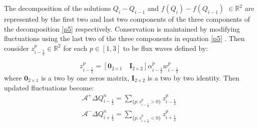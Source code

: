 \documentclass[10pt,a4paper]{article}
\newcommand{\donna}[1]{{\color{red}{#1}}}
\begin{document}
	The decomposition of the solutions $Q_{i} - Q_{i-1} $  and  $f(Q_{i}) - f(Q_{i-1})$ $ \in  \mathbb{R}^{2}$ are represented by the first two and last two components of the three components of the decomposition \eqref{p5} respectively.  Conservation is maintained by modifying fluctuations using the last two of the three components  in equation \eqref{p5} \cite{ba-le-mi-ro:2003}. Then  consider $z_{i-\frac{1}{2}}^{p} \in \mathbb{R}^{2}$ for each $p \in [1,3]$ to be flux waves defined by:
	

	\begin{equation}
		z_{i-\frac{1}{2}}^{p} = [\mathbf{0}_{2\times1} \quad \mathbf{I}_{2\times2}] \alpha_{i-\frac{1}{2}}^{p} w_{i-\frac{1}{2}}^{p}
	\end{equation}
	where $\mathbf{0}_{2\times1}$ is a two by one zeros matrix, $\mathbf{I}_{2\times2}$ is a two by two identity. Then updated fluctuations become:
	\begin{eqnarray}
		\mathcal{A^{+}}\Delta Q_{i-\frac{1}{2}}^{n} = \sum_{\{ p:s_{i-\frac{1}{2}}^{p}>0\}}  z_{i-\frac{1}{2}}^{p}
		\label{p7}\\
		\mathcal{A^{-}}\Delta Q_{i+\frac{1}{2}}^{n} = \sum_{\{ p:s_{i+\frac{1}{2}}^{p}<0\}} z_{i+\frac{1}{2}}^{p}
		\label{p8}
	\end{eqnarray}

	\donna{Add a few conclusions that suggest this approach works. }	
\end{document}
